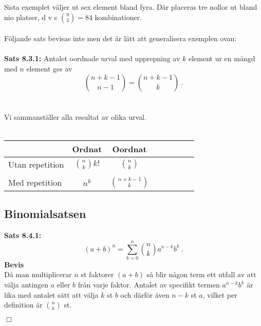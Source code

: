 \documentclass{article}
\begin{document}
Sista exemplet väljer ut sex element bland fyra. Där placeras tre nollor ut bland nio platser, d v s ${9 \choose 3}=84$ kombinationer.\\ \\
Följande sats bevisas inte men det är lätt att generalisera exemplen ovan:\\ \\
\textbf{Sats 8.3.1:} Antalet oordnade urval med upprepning av $k$ element ur en mängd med $n$ element ges av
$$
{n+k-1 \choose n-1}={n+k-1 \choose k} \ .
$$
\\ \\
Vi sammanställer alla resultat av olika urval.\\ \\
\begin{tabular}{l*{6}{c}r}

              & Ordnat & Oordnat \\
\hline
Utan repetition & ${n \choose k}k!$ & ${n \choose k}$ \\ \\
Med repetition  & $n^k$ & ${n+k-1 \choose k}$ \\
\hline
\end{tabular}
\vspace{1 cm}
\subsection{Binomialsatsen}
\textbf{Sats 8.4.1:}
$$
(a+b)^n=\sum_{k=0}^n{n\choose k}a^{n-k}b^{k} \ .
$$
\textbf{Bevis}\\
Då man multiplicerar $n$ st faktorer $(a+b)$ så blir någon term ett utfall av att välja antingen $a$ eller $b$ från varje faktor. Antalet av specifikt termen $a^{n-k}b^k$ är lika med antalet sätt att välja $k$ st $b$ och därför även $n-k$ st $a$, vilket per definition är ${n\choose k}$ st.
\begin{flushright}
$\Box$
\end{flushright}
\end{document}
